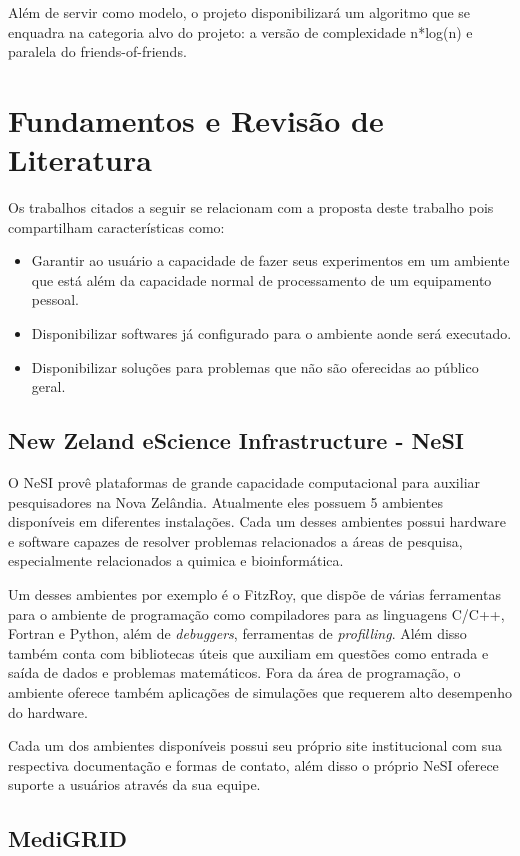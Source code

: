 \documentclass[tg]{mdtufsm}
\begin{document}
Além de servir como modelo, o projeto disponibilizará um algoritmo que se enquadra na categoria alvo do projeto: a versão de complexidade n*log(n) e paralela do friends-of-friends.

\chapter{Fundamentos e Revisão de Literatura}
Os trabalhos citados a seguir se relacionam com a proposta deste trabalho pois compartilham características como:
\begin{itemize}
	\item Garantir ao usuário a capacidade de fazer seus experimentos em um ambiente que está além da capacidade normal de processamento de um equipamento pessoal.
	\item Disponibilizar softwares já configurado para o ambiente aonde será executado.
	\item Disponibilizar soluções para problemas que não são oferecidas ao público geral.
\end{itemize}

\section{New Zeland eScience Infrastructure - NeSI}

O NeSI\cite{nesi} provê plataformas de grande capacidade computacional para auxiliar pesquisadores na Nova Zelândia. Atualmente eles possuem 5 ambientes disponíveis em diferentes instalações. Cada um desses ambientes possui  hardware e software capazes de resolver problemas relacionados a áreas de pesquisa, especialmente  relacionados a quimica e bioinformática. 

Um desses ambientes por exemplo é o FitzRoy, que dispõe de várias ferramentas para o ambiente de programação como compiladores para as linguagens C/C++, Fortran e Python, além de \textit{debuggers}, ferramentas de \textit{profilling}. Além disso também conta com bibliotecas úteis que auxiliam em questões como entrada e saída de dados e problemas matemáticos. Fora da área de programação, o ambiente oferece também aplicações de simulações que requerem alto desempenho do hardware.

Cada um dos ambientes disponíveis possui seu próprio site institucional com sua respectiva documentação e formas de contato, além disso o próprio NeSI oferece suporte a usuários através da sua equipe.

\section{MediGRID}
\end{document}
